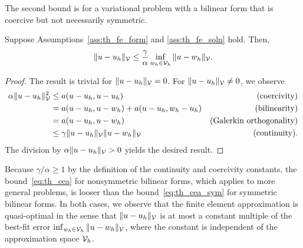 The second bound is for a variational problem with a bilinear form that is coercive but not necessarily symmetric.
\begin{lemma}
  \label{lemma:th_cea_nonsym}
   Suppose Assumptions~\ref{ass:th_fe_form} and \ref{ass:th_fe_soln} hold. Then, 
  \begin{equation}
    \| u - u_h \|_{\mathcal{V}} \leq \frac{\gamma}{\alpha} \inf_{w_h \in \mathcal{V}_h} \| u - w_h \|_{\mathcal{V}}.
    \label{eq:th_cea}
  \end{equation}
  \begin{proof}
    The result is trivial for $\| u - u_h \|_{\mathcal{V}} = 0$.  For $\| u - u_h \|_{\mathcal{V}} \neq 0$, we observe
    \begin{align*}
      \alpha \| u - u_h \|^2_{\mathcal{V}}
      &\leq a(u - u_h, u - u_h) & \text{(coercivity)} \\
      &= a(u - u_h, u - w_h) + a(u - u_h, w_h - u_h) &\text{(bilinearity)} \\
      &= a(u - u_h, u - w_h) &\text{(Galerkin orthogonality)} \\
      &\leq \gamma \| u - u_h \|_{\mathcal{V}} \| u - w_h \|_{\mathcal{V}} &\text{(continuity)}.
    \end{align*}
    The division by $\alpha \| u - u_h \|_{\mathcal{V}} > 0$ yields the desired result.
  \end{proof}
\end{lemma}
Because $\gamma/\alpha \geq 1$ by the definition of the continuity and coercivity constants, the bound~\eqref{eq:th_cea} for nonsymmetric bilinear forms, which applies to more general problems, is looser than the bound~\eqref{eq:th_cea_sym} for symmetric bilinear forms.  In both cases, we observe that the finite element approximation is quasi-optimal in the sense that $\| u - u_h \|_{\mathcal{V}}$ is at most a constant multiple of the best-fit error $\inf_{w_h \in \mathcal{V}_h} \| u - w_h \|_{\mathcal{V}}$, where the constant is independent of the approximation space $\mathcal{V}_h$.

